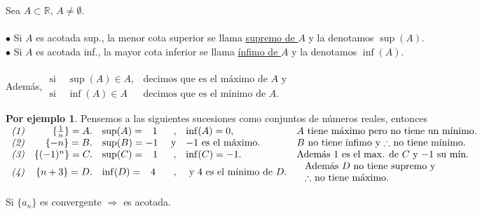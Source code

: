 \documentclass{article}
\theoremstyle{definition}
\newtheorem*{ej}{Por ejemplo}
\theoremstyle{remark}
\newcommand\R{\ensuremath{\mathbb{R}}}
\begin{document}
\begin{defi}
  Sea $A \subset \R $, $A\neq \emptyset $. \; \\ \\
  $\bullet$ \; Si $A$ es acotada sup., la menor cota superior se llama \underline{supremo de $A$} y la denotamos $\sup(A)$. \\
  $\bullet$ \; Si $A$ es acotada inf., la mayor cota inferior se llama \underline{ínfimo de $A$} y la denotamos $\inf(A)$. \\ \\
Además, 
$\begin{array}{lcl}
  \text{si } & \sup(A) \in A, & \text{decimos que es el máximo de $A$ y} \\
  \text{si } & \inf(A) \in A & \text{decimos que es el mínimo de $A$}.  
  \end{array}$
\end{defi}
\pagebreak
\begin{ej}
Pensemos a las siguientes sucesiones como conjuntos de números reales, entonces \\
$ \begin{array}{lrlrll}
  \emph{(1)} & \{\frac{1}{n}\}=A. & \sup(A)=\phantom{-}1 & , &\inf(A)=0,   &  A \text{ tiene máximo pero no tiene un mínimo.} \\
\emph{(2)} & \{-n\}=B.          & \sup(B)=-1 & \text{ y} & \text{$-1$ es el máximo.} &  \text{$B$ no tiene ínfimo y $\therefore$ no tiene mínimo.} \\
\emph{(3)} & \{(-1)^n\}=C.      & \sup(C)=\phantom{-}1 &,&\inf(C)=-1.             & \text{Además $1$ es el max. de $C$ y $-1$ su mín.} \\
\emph{(4)} & \{n+3\}=D.         & \inf(D)=\phantom{-}4 &,&    \text{ y $4$ es el mínimo de $D$.} & \begin{array}{l}
  \text{ Además $D$ no tiene supremo y} \\
  \text{ $\therefore$ no tiene máximo.}        
  \end{array}
  \end{array}$
\end {ej}


\begin{teo}
  Si $\{a_n\}$ es convergente $\Rightarrow$ es acotada.
\end{teo}
\end{document}
